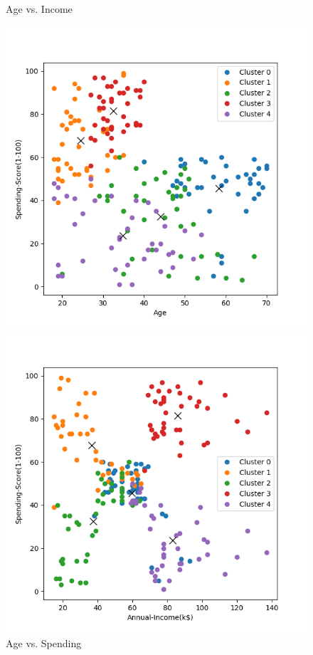 \documentclass[8pt]{article}
\begin{document}
\begin{figure}[H]
\begin{minipage}{0.32\textwidth}
        \caption{Age vs. Income}
        \label{fig: Age vs. Annual Income k5 com con min20}
    \end{minipage}
    \hfill
    \begin{minipage}{0.32\textwidth}
        \centering
        \includegraphics[width=\textwidth]{./Prob4/out/task3_2_com/images/cluster_result_k5_0_2.png}
        \caption{Age vs. Spending}
        \label{fig: Age vs. Spending Score k5 com con min20}
    \end{minipage}
    \hfill
    \begin{minipage}{0.32\textwidth}
        \centering
        \includegraphics[width=\textwidth]{./Prob4/out/task3_2_com/images/cluster_result_k5_1_2.png}

\end{minipage}
\end{figure}
\end{document}
